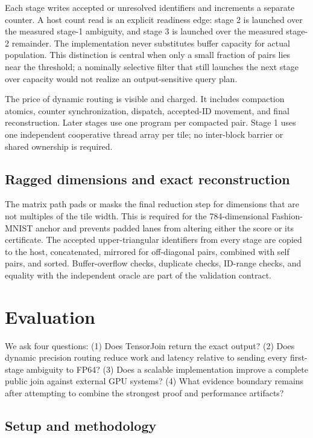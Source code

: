 \documentclass[sigconf,review,anonymous]{acmart}
\newcommand{\system}{TensorJoin\xspace}
\begin{document}
Each stage writes accepted or unresolved identifiers and increments a separate
counter.  A host count read is an explicit readiness edge: stage 2 is launched
over the measured stage-1 ambiguity, and stage 3 is launched over the measured
stage-2 remainder.  The implementation never substitutes buffer capacity for
actual population.  This distinction is central when only a small fraction of
pairs lies near the threshold; a nominally selective filter that still
launches the next stage over capacity would not realize an output-sensitive
query plan.

The price of dynamic routing is visible and charged.  It includes compaction
atomics, counter synchronization, dispatch, accepted-ID movement, and final
reconstruction.  Later stages use one program per compacted pair.  Stage 1
uses one independent cooperative thread array per tile; no inter-block barrier
or shared ownership is required.

\subsection{Ragged dimensions and exact reconstruction}

The matrix path pads or masks the final reduction step for dimensions that are
not multiples of the tile width.  This is required for the 784-dimensional
Fashion-MNIST anchor and prevents padded lanes from altering either the score
or its certificate.  The accepted upper-triangular identifiers from every
stage are copied to the host, concatenated, mirrored for off-diagonal pairs,
combined with self pairs, and sorted.  Buffer-overflow checks, duplicate
checks, ID-range checks, and equality with the independent oracle are part of
the validation contract.

\section{Evaluation}

We ask four questions: (1) Does \system return the exact output? (2) Does
dynamic precision routing reduce work and latency relative to sending every
first-stage ambiguity to FP64? (3) Does a scalable implementation improve a
complete public join against external GPU systems? (4) What evidence boundary
remains after attempting to combine the strongest proof and performance
artifacts?

\subsection{Setup and methodology}
\end{document}
